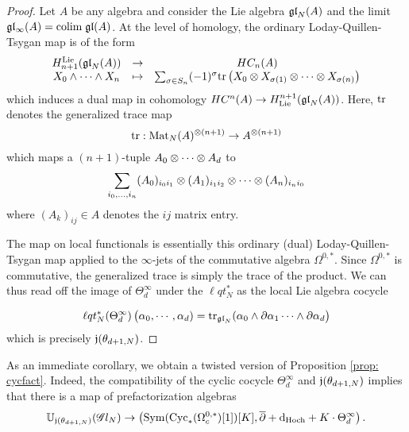 \begin{proof}
Let $A$ be any algebra and consider the Lie algebra ${\mathfrak{gl}}_N(A)$ and the limit $\mathfrak{g} \mathfrak{l}_\infty(A) = {\rm colim} \; {\mathfrak{gl}} (A)$. 
At the level of homology, the ordinary Loday-Quillen-Tsygan map is of the form
\[
\begin{array}{ccc}
H_{n+1}^{\rm Lie}({\mathfrak{gl}}_N(A)) & \to & HC_{n}(A) \\
X_0 \wedge \cdots \wedge X_n & \mapsto & \sum_{\sigma \in S_n} (-1)^{\sigma} {\rm tr} \left(X_0 \otimes X_{\sigma(1)} \otimes\cdots \otimes X_{\sigma(n)} \right) 
\end{array}
\] 
which induces a dual map in cohomology $HC^n(A) \to H^{n+1}_{\rm Lie}({\mathfrak{gl}}_N(A))$. 
Here, ${\rm tr}$ denotes the generalized trace map
\[
{\rm tr} : {\rm Mat}_N(A)^{\otimes(n+1)} \to A^{\otimes (n+1)} 
\]
which maps a $(n+1)$-tuple $A_0\otimes \cdots \otimes A_d$ to 
\[
\sum_{i_0,\ldots,i_n} (A_0)_{i_0 i_1} \otimes (A_1)_{i_1i_2} \otimes \cdots \otimes (A_n)_{i_n i_0}
\]
where $(A_k)_{ij} \in A$ denotes the $ij$ matrix entry.

The map on local functionals is essentially this ordinary (dual) Loday-Quillen-Tsygan map applied to the $\infty$-jets of the commutative algebra $\Omega^{0,*}$. 
Since $\Omega^{0,*}$ is commutative, the generalized trace is simply the trace of the product.
We can thus read off the image of $\Theta^\infty_d$ under the $\ell q t_N^*$ as the local Lie algebra cocycle

\begin{align*}
\ell q t_N^*(\Theta_d^\infty)\left(\alpha_0, \cdots, \alpha_d) = {\rm tr}_{{\mathfrak{gl}}_N}(\alpha_0 \wedge \partial \alpha_1 \cdots \wedge \partial \alpha_d\right)
\end{align*}
which is precisely $\mathfrak j(\theta_{d+1,N})$. 
\end{proof}

As an immediate corollary, we obtain a twisted version of Proposition \ref{prop: cycfact}.
Indeed, the compatibility of the cyclic cocycle $\Theta^\infty_d$ and $\mathfrak j(\theta_{d+1,N})$ implies that there is a map of prefactorization algebras
\[
\mathbb U_{\mathfrak j(\theta_{d+1,N})} (\mathscr G l_N) \to \left({\rm Sym}({\rm Cyc}_*(\Omega^{0,*}_c)[1])[K], \overline{\partial} + {\rm d}_{\rm Hoch} + K \cdot \Theta^\infty_d \right) .
\]

